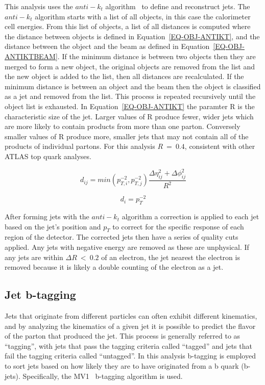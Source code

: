 This analysis uses the $anti-k_t$ algorithm~\cite{AntiKt} to define and reconstruct jets. The $anti-k_t$ algorithm starts with a list of all objects, in this case the calorimeter cell energies. From this list of objects, a list of all distances is computed where the distance between objects is defined in Equation~\ref{EQ-OBJ-ANTIKT}, and the distance between the object and the beam as defined in Equation~\ref{EQ-OBJ-ANTIKTBEAM}. If the minimum distance is between two objects then they are merged to form a new object, the original objects are removed from the list and the new object is added to the list, then all distances are recalculated. If the minimum distance is between an object and the beam then the object is classified as a jet and removed from the list. This process is repeated recursively until the object list is exhausted. In Equation~\ref{EQ-OBJ-ANTIKT} the paramter R is the characteristic size of the jet. Larger values of R produce fewer, wider jets which are more likely to contain products from more than one parton. Conversely smaller values of R produce more, smaller jets that may not contain all of the products of individual partons. For this analysis $R\ =\ 0.4$, consistent with other ATLAS top quark analyses. 

\begin{equation}
\label{EQ-OBJ-ANTIKT}
d_{ij} = min(p^{-2}_{T,i},p^{-2}_{T,j})\frac{\Delta\eta^{2}_{ij}+\Delta\phi^{2}_{ij}}{R^{2}}
\end{equation}

\begin{equation}
\label{EQ-OBJ-ANTIKTBEAM}
d_{i} = p^{-2}_{T}
\end{equation}

After forming jets with the $anti-k_t$ algorithm a correction is applied to each jet based on the jet's position and $p_T$ to correct for the specific response of each region of the detector. The corrected jets then have a series of quality cuts applied. Any jets with negative energy are removed as these are unphysical. If any jets are within $\Delta R\ <\ 0.2$ of an electron, the jet nearest the electron is removed because it is likely a double counting of the electron as a jet.

\subsection{Jet b-tagging}
\label{SECTION-OBJ-JET-BTAG}
Jets that originate from different particles can often exhibit different kinematics, and by analyzing the kinematics of a given jet it is possible to predict the flavor of the parton that produced the jet. This process is generally referred to as ``tagging'', with jets that pass the tagging criteria called ``tagged'' and jets that fail the tagging criteria called ``untagged''. In this analysis b-tagging is employed to sort jets based on how likely they are to have originated from a b quark (b-jets). Specifically, the MV1~\cite{MV1} b-tagging algorithm is used. 

